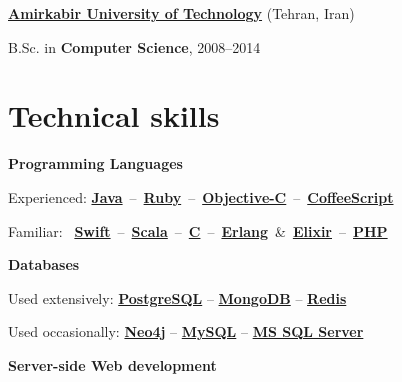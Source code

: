 \documentclass{tccv}
\begin{document}
{\bf \href{https://en.wikipedia.org/wiki/Amirkabir_University_of_Technology}{Amirkabir University of Technology}} (Tehran, Iran)

\hspace{7pt} B.Sc. in {\bf Computer Science}, 2008--2014





\section{Technical skills}

\hspace{-1pt}%
\textsf{\textbf{Programming Languages}}
	 
\hspace{2pt}%
Experienced:
\mbox{\href{http://www.oracle.com/technetwork/java/}{\bf Java} -- %
     \href{https://www.ruby-lang.org/en/}{\bf Ruby} -- %
     \href{https://en.wikipedia.org/wiki/Objective-C}{\bf Objective-C} -- %
     \href{http://coffeescript.org}{\bf CoffeeScript}%
}

\hspace{2pt}%
Familiar:
\mbox{%
     \href{https://developer.apple.com/swift/}{\bf Swift} -- %
     \href{http://www.scala-lang.org}{\bf Scala} -- %
     \href{https://en.wikipedia.org/wiki/C_(programming_language)}{\bf C} -- %
     \href{http://www.erlang.org}{\bf Erlang} \& %
     \href{http://elixir-lang.org}{\bf Elixir} --  %
     \href{http://php.net}{\bf PHP}%
}



\vspace{6pt}%
\hspace{-1pt}%
\textsf{\textbf{Databases}}
	 
\hspace{2pt}%
Used extensively: %
     \href{http://www.postgresql.org}{\bf PostgreSQL} -- %
     \href{http://www.mongodb.org}{\bf MongoDB} -- %
     \href{http://redis.io}{\bf Redis}%

\hspace{2pt}%
Used occasionally: %
     \href{http://www.neo4j.org}{\bf Neo4j} -- %
     \href{http://www.mysql.com}{\bf MySQL} -- %
     \href{http://www.microsoft.com/en-us/sqlserver/default.aspx}{\bf MS SQL Server}%



\vspace{9pt}%
\hspace{-1pt}%
\textsf{\textbf{Server-side Web development}}
 
\end{document}
